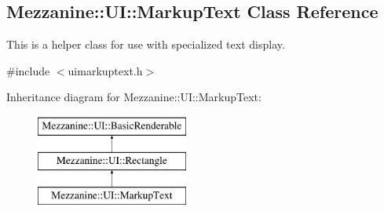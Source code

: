 \hypertarget{classMezzanine_1_1UI_1_1MarkupText}{
\subsection{Mezzanine::UI::MarkupText Class Reference}
\label{classMezzanine_1_1UI_1_1MarkupText}
}


This is a helper class for use with specialized text display.  




{\ttfamily \#include $<$uimarkuptext.h$>$}

Inheritance diagram for Mezzanine::UI::MarkupText:\begin{figure}[H]
\begin{center}
\leavevmode
\includegraphics[height=3.000000cm]{classMezzanine_1_1UI_1_1MarkupText}
\end{center}
\end{figure}
